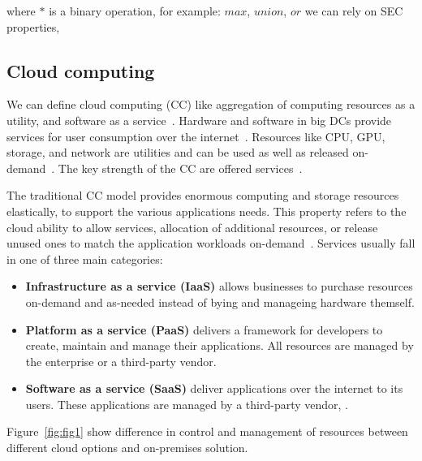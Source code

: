 \noindent
where $*$ is a binary operation, for example: $max$, $union$, $or$ we can rely on SEC properties,
%
%
\subsection{Cloud computing}\label{sec:cloud_computing}
%
We can define cloud computing (CC) like aggregation of computing resources as a utility, and software as a service~\cite{Vogels}. Hardware and software in big DCs provide services for user consumption over the internet~\cite{AboveTheCloud}. Resources like CPU, GPU, storage, and network are utilities and can be used as well as released on-demand~\cite{ZhangCB10}. The key strength of the CC are offered services~\cite{Vogels}. 

The traditional CC model provides enormous computing and storage resources elastically, to support the various applications needs. This property refers to the cloud ability to allow services, allocation of additional resources, or release unused ones to match the application workloads on-demand~\cite{AssuncaoVB18}. Services usually fall in one of three main categories: 

\begin{itemize}
	\item \textbf{Infrastructure as a service (IaaS)} allows businesses to purchase resources on-demand and as-needed instead of bying and manageing hardware themself.
	\item \textbf{Platform as a service (PaaS)} delivers a framework for developers to create, maintain and manage their applications. All resources are managed by the enterprise or a third-party vendor.
	\item \textbf{Software as a service (SaaS)} deliver applications over the internet to its users. These applications are managed by a third-party vendor, .
\end{itemize}

Figure~\ref{fig:fig1} show difference in control and management of resources between different cloud options and on-premises solution.

